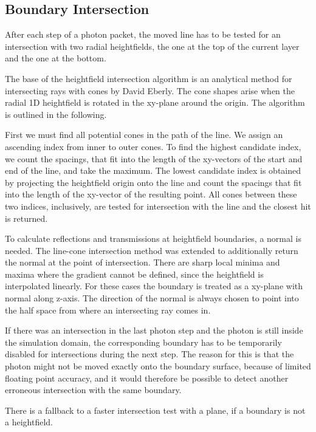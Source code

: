 \documentclass[]{article}
\begin{document}
\subsection{Boundary Intersection}

After each step of a photon packet, the moved line has to be tested for an intersection with two radial heightfields, the one at the top of the current layer and the one at the bottom.

The base of the heightfield intersection algorithm is an analytical method for intersecting rays with cones by David Eberly\cite{schneider2002geometric}. The cone shapes arise when the radial 1D heightfield is rotated in the xy-plane around the origin. The algorithm is outlined in the following.

First we must find all potential cones in the path of the line. We assign an ascending index from inner to outer cones. To find the highest candidate index, we count the spacings, that fit into the length of the xy-vectors of the start and end of the line, and take the maximum. The lowest candidate index is obtained by projecting the heightfield origin onto the line and count the spacings that fit into the length of the xy-vector of the resulting point. All cones between these two indices, inclusively, are tested for intersection with the line and the closest hit is returned.

To calculate reflections and transmissions at heightfield boundaries, a normal is needed. The line-cone intersection method was extended to additionally return the normal at the point of intersection. There are sharp local minima and maxima where the gradient cannot be defined, since the heightfield is interpolated linearly. For these cases the boundary is treated as a xy-plane with normal along z-axis. The direction of the normal is always chosen to point into the half space from where an intersecting ray comes in.

If there was an intersection in the last photon step and the photon is still inside the simulation domain, the corresponding boundary has to be temporarily disabled for intersections during the next step. The reason for this is that the photon might not be moved exactly onto the boundary surface, because of limited floating point accuracy, and it would therefore be possible to detect another erroneous intersection with the same boundary.

There is a fallback to a faster intersection test with a plane, if a boundary is not a heightfield.
\end{document}

